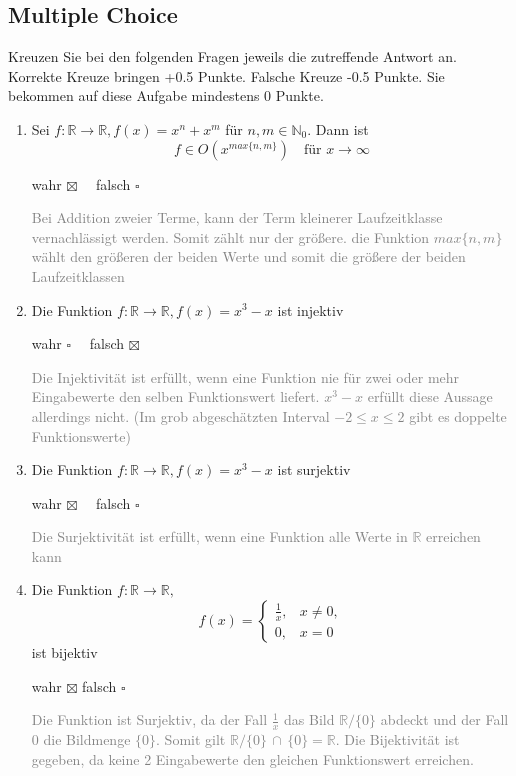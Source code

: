 \documentclass[a4paper]{article}
\begin{document}
\setcounter{section}{7}
\subsection{Multiple Choice}
Kreuzen Sie bei den folgenden Fragen jeweils die zutreffende Antwort an. Korrekte Kreuze bringen +0.5 Punkte. Falsche Kreuze -0.5 Punkte. Sie bekommen auf diese Aufgabe mindestens 0 Punkte.
\begin{enumerate}[label=(\alph*)]
    \item Sei $f: \mathbb{R} \rightarrow \mathbb{R}, f(x) = x^n + x^m$ für  $n, m \in \mathbb{N}_0$. Dann ist
    \[f \in O\left(x^{max\{n, m\}}\right) \quad \text{für } x \rightarrow \infty\]
    \begin{flushright}
        wahr $\boxtimes\quad$ falsch $\square$
    \end{flushright}
    \textcolor{gray}{Bei Addition zweier Terme, kann der Term kleinerer Laufzeitklasse vernachlässigt werden. Somit zählt nur der größere. die Funktion $max\{n, m\}$ wählt den größeren der beiden Werte und somit die größere der beiden Laufzeitklassen}

    \item Die Funktion $f: \mathbb{R} \rightarrow \mathbb{R}, f(x) = x^3 - x$ ist injektiv
    \begin{flushright}
        wahr $\square\quad$ falsch $\boxtimes$
    \end{flushright}
    \textcolor{gray}{Die Injektivität ist erfüllt, wenn eine Funktion nie für zwei oder mehr Eingabewerte den selben Funktionswert liefert. $x^3 - x$ erfüllt diese Aussage allerdings nicht. (Im grob abgeschätzten Interval $-2 \leq x \leq 2$ gibt es doppelte Funktionswerte)}

    \item Die Funktion $f: \mathbb{R} \rightarrow \mathbb{R}, f(x) = x^3 - x$ ist surjektiv
    \begin{flushright}
        wahr $\boxtimes\quad$ falsch $\square$
    \end{flushright}
    \textcolor{gray}{Die Surjektivität ist erfüllt, wenn eine Funktion alle Werte in $\mathbb{R}$ erreichen kann}

    \item Die Funktion $f: \mathbb{R} \rightarrow \mathbb{R},$
    \[f(x) = \begin{cases}
        \frac{1}{x}, & x \neq 0,\\
        0, & x = 0
    \end{cases}\]
    ist bijektiv
    \begin{flushright}
        wahr $\boxtimes$ falsch $\square\quad$
    \end{flushright}
    \textcolor{gray}{Die Funktion ist Surjektiv, da der Fall $\frac{1}{x}$ das Bild $\mathbb{R}/\{0\}$ abdeckt und der Fall $0$ die Bildmenge $\{0\}$. Somit gilt $\mathbb{R}/\{0\} \,\cap \,\{0\} = \mathbb{R}$. Die Bijektivität ist gegeben, da keine 2 Eingabewerte den gleichen Funktionswert erreichen.}
\end{enumerate}
\clearpage
\end{document}
